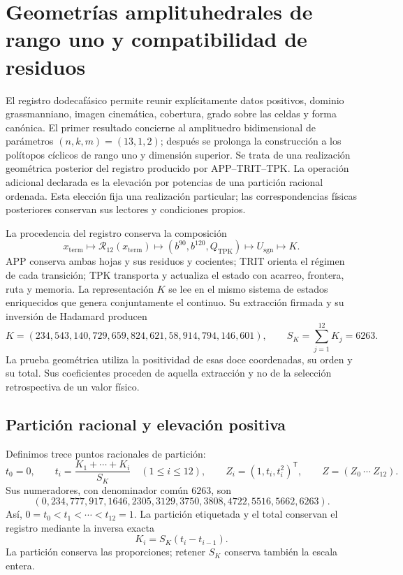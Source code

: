 \section{Geometrías amplituhedrales de rango uno y compatibilidad de residuos}
\label{sec:k-poligono-amplituhedral}

El registro dodecafásico permite reunir explícitamente datos positivos,
dominio grassmanniano, imagen cinemática, cobertura, grado sobre las celdas
y forma canónica. El primer resultado concierne al amplituedro
bidimensional de parámetros \((n,k,m)=(13,1,2)\); después se prolonga la
construcción a los polítopos cíclicos de rango uno y dimensión superior.
Se trata de una realización geométrica posterior del registro producido
por APP--TRIT--TPK. La operación adicional declarada es la elevación por
potencias de una partición racional ordenada. Esta elección fija una
realización particular; las correspondencias físicas posteriores conservan
sus lectores y condiciones propios.

La procedencia del registro conserva la composición
\[
 x_{\mathrm{term}}\longmapsto\mathcal R_{12}(x_{\mathrm{term}})
 \longmapsto(b^{90},b^{120},Q_{\mathrm{TPK}})
 \longmapsto U_{\mathrm{sgn}}\longmapsto K.
\]
APP conserva ambas hojas y sus residuos y cocientes; TRIT orienta el
régimen de cada transición; TPK transporta y actualiza el estado con
acarreo, frontera, ruta y memoria. La representación \(K\) se lee en el mismo
sistema de estados enriquecidos que genera conjuntamente el continuo.
Su extracción firmada y su inversión
de Hadamard producen
\begin{equation}
 K=(234,543,140,729,659,824,621,58,914,794,146,601),
 \qquad S_K=\sum_{j=1}^{12}K_j=6263.
 \label{eq:polygon-K}
\end{equation}
La prueba geométrica utiliza la positividad de esas doce coordenadas, su
orden y su total. Sus coeficientes proceden de aquella extracción y no de
la selección retrospectiva de un valor físico.

\subsection{Partición racional y elevación positiva}

Definimos trece puntos racionales de partición:
\begin{equation}
 t_0=0,\qquad t_i=\frac{K_1+\cdots+K_i}{S_K}\quad(1\leq i\leq12),
 \qquad Z_i=(1,t_i,t_i^2)^\mathsf T,\qquad Z=(Z_0\ \cdots\ Z_{12}).
 \label{eq:polygon-Z}
\end{equation}
Sus numeradores, con denominador común \(6263\), son
\[
 (0,234,777,917,1646,2305,3129,3750,3808,4722,5516,5662,6263).
\]
Así, \(0=t_0<t_1<\cdots<t_{12}=1\). La partición etiquetada y el total
conservan el registro mediante la inversa exacta
\begin{equation}
 K_i=S_K(t_i-t_{i-1}).
 \label{eq:polygon-recover-K}
\end{equation}
La partición conserva las proporciones; retener \(S_K\) conserva también
la escala entera.


